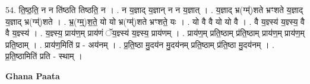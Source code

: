 \documentclass[17pt]{extarticle}
\begin{document}
54. ति॒ष्ठ॒ति॒ न न ति॑ष्ठति तिष्ठति॒ न । . न य॒ज्ञाद् य॒ज्ञान् न न य॒ज्ञात् । . य॒ज्ञाद् भ्र(ग्म्॑)शते भ्रꣳशते य॒ज्ञाद् य॒ज्ञाद् भ्र(ग्म्॑)शते । . भ्र॒(ग्म्॒)श॒ते॒ यो यो भ्र(ग्म्॑)शते भ्रꣳशते॒ यः । . यो वै वै यो यो वै । . वै य॒ज्ञ्स्य॑ य॒ज्ञ्स्य॒ वै वै य॒ज्ञ्स्य॑ । . य॒ज्ञ्स्य॒ प्राय॑ण॒म् प्राय॑णं ॅय॒ज्ञ्स्य॑ य॒ज्ञ्स्य॒ प्राय॑णम् । . प्राय॑ण॒म् प्रति॒ष्ठाम् प्र॑ति॒ष्ठाम् प्राय॑ण॒म् प्राय॑ण॒म् प्रति॒ष्ठाम् । . प्राय॑ण॒मिति॑ प्र - अय॑नम् । . प्र॒ति॒ष्ठा मु॒दय॑न मु॒दय॑नम् प्रति॒ष्ठाम् प्र॑ति॒ष्ठा मु॒दय॑नम् । . प्र॒ति॒ष्ठामिति॑ प्रति - स्थाम् । \newline

\textbf{Ghana Paata } \newline
\end{document}

